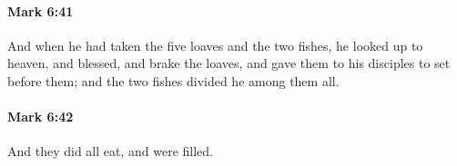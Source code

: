 		\paragraph{Mark 6:41} %
			\label{MARK-6-41}

			And when he had taken the five loaves and the two fishes, he looked up to heaven, and blessed, and brake the loaves, and gave them to his disciples to set before them; and the two fishes divided he among them all.

			\begin{framed}
			\scriptsize
				\begin{compactdesc}
					\item[SBLG] 
				\end{compactdesc}
			\end{framed}

		\paragraph{Mark 6:42} %
			\label{MARK-6-42}

			And they did all eat, and were filled.

